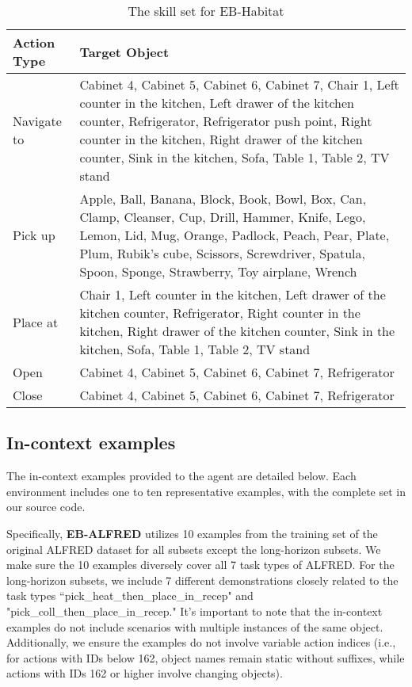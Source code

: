 \begin{table}[h]
\centering
\begin{tabular}{p{2cm}|p{12cm}}
\toprule
\textbf{Action Type} & \textbf{Target Object} \\
\midrule
{\centering Navigate to} & Cabinet 4, Cabinet 5, Cabinet 6, Cabinet 7, Chair 1, Left counter in the kitchen, Left drawer of the kitchen counter, Refrigerator, Refrigerator push point, Right counter in the kitchen, Right drawer of the kitchen counter, Sink in the kitchen, Sofa, Table 1, Table 2, TV stand \\
\midrule
{\centering Pick up} & Apple, Ball, Banana, Block, Book, Bowl, Box, Can, Clamp, Cleanser, Cup, Drill, Hammer, Knife, Lego, Lemon, Lid, Mug, Orange, Padlock, Peach, Pear, Plate, Plum, Rubik’s cube, Scissors, Screwdriver, Spatula, Spoon, Sponge, Strawberry, Toy airplane, Wrench \\
\midrule
{\centering Place at} & Chair 1, Left counter in the kitchen, Left drawer of the kitchen counter, Refrigerator, Right counter in the kitchen, Right drawer of the kitchen counter, Sink in the kitchen, Sofa, Table 1, Table 2, TV stand \\
\midrule
{\centering Open} & Cabinet 4, Cabinet 5, Cabinet 6, Cabinet 7, Refrigerator \\
\midrule
{\centering Close} & Cabinet 4, Cabinet 5, Cabinet 6, Cabinet 7, Refrigerator \\
\bottomrule
\end{tabular}
\caption{The skill set for EB-Habitat}
\label{tab:prompt}
\end{table}


\clearpage
\subsection{In-context examples}
The in-context examples provided to the agent are detailed below. Each environment includes one to ten representative examples, with the complete set in our source code.

Specifically, \textbf{EB-ALFRED} utilizes 10 examples from the training set of the original ALFRED dataset for all subsets except the long-horizon subsets. We make sure the 10 examples diversely cover all 7 task types of ALFRED. For the long-horizon subsets, we include 7 different demonstrations closely related to the task types ``pick\_heat\_then\_place\_in\_recep" and "pick\_coll\_then\_place\_in\_recep." It’s important to note that the in-context examples do not include scenarios with multiple instances of the same object. Additionally, we ensure the examples do not involve variable action indices (i.e., for actions with IDs below 162, object names remain static without suffixes, while actions with IDs 162 or higher involve changing objects). 

